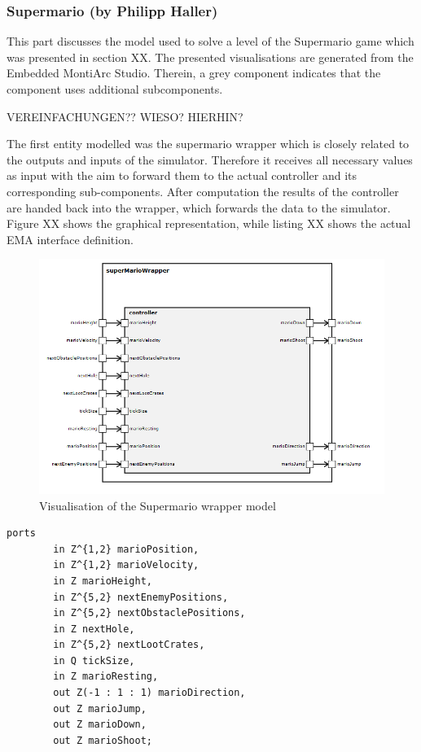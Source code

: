 \newpage
\subsubsection{Supermario (by Philipp Haller)}

This part discusses the model used to solve a level of the Supermario game which was presented in section XX. The presented visualisations are generated from the Embedded MontiArc Studio. Therein, a grey component indicates that the component uses additional subcomponents. 

VEREINFACHUNGEN?? WIESO? HIERHIN?

The first entity modelled was the supermario wrapper which is closely related to the outputs and inputs of the simulator. Therefore it receives all necessary values as input with the aim to forward them to the actual controller and its corresponding sub-components. After computation the results of the controller are handed back into the wrapper, which forwards the data to the simulator. Figure XX shows the graphical representation, while listing XX shows the actual EMA interface definition.
\begin{figure}
	\centering
	\includegraphics[scale=0.5]{pictures/haller_supermariowrapper.PNG}
	\caption{Visualisation of the Supermario wrapper model}
	\label{fig:marioWrapper}
\end{figure}

\begin{lstlisting}[label=lst:marioWrapperInterface, caption=Interface of the Supermario Wrapper, morekeywords={ports, port, connect, in, out, instance, ->},
frame=single]
    ports   
        in Z^{1,2} marioPosition,
        in Z^{1,2} marioVelocity,
        in Z marioHeight,
        in Z^{5,2} nextEnemyPositions,
        in Z^{5,2} nextObstaclePositions,
        in Z nextHole,
        in Z^{5,2} nextLootCrates,
        in Q tickSize,
        in Z marioResting,
        out Z(-1 : 1 : 1) marioDirection,
        out Z marioJump,
        out Z marioDown,
        out Z marioShoot;
\end{lstlisting}

